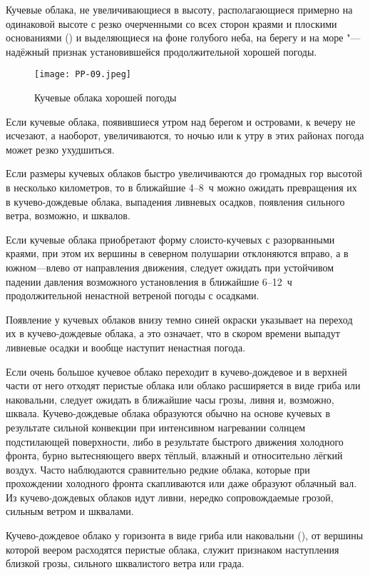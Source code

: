  Кучевые облака, не увеличивающиеся в высоту, располагающиеся
примерно на одинаковой высоте с резко очерченными со всех сторон
краями и плоскими основаниями () и выделяющиеся на фоне
голубого неба, на берегу и на море "--- надёжный признак установившейся
продолжительной хорошей погоды.

\begin{figure}[htb]
  \centering{}
  \texttt{[image: PP-09.jpeg]}
  \caption{Кучевые облака хорошей погоды}
  \label{fig:pp09}
  \small
  \centering{}
\end{figure}

 Если кучевые облака, появившиеся утром над берегом и островами,
к вечеру не исчезают, а наоборот, увеличиваются, то ночью или к утру в
этих районах погода может резко ухудшиться.

 Если размеры кучевых облаков быстро увеличиваются до громадных
гор высотой в несколько километров, то в ближайшие 4--8~ч можно ожидать
превращения их в кучево-дождевые облака, выпадения ливневых осадков,
появления сильного ветра, возможно, и шквалов.

 Если кучевые облака приобретают форму слоисто-кучевых с
разорванными краями, при этом их вершины в северном полушарии
отклоняются вправо, а в южном—влево от направления движения, следует
ожидать при устойчивом падении давления возможного установления в
ближайшие 6--12~ч продолжительной ненастной ветреной погоды с
осадками.

 Появление у кучевых облаков внизу темно синей окраски указывает
на переход их в кучево-дождевые облака, а это означает, что в скором
времени выпадут ливневые осадки и вообще наступит ненастная погода.

 Если очень большое кучевое облако переходит в кучево-дождевое и
в верхней части от него отходят перистые облака или облако расширяется
в виде гриба или наковальни, следует ожидать в ближайшие часы грозы,
ливня и, возможно, шквала. Кучево-дождевые облака образуются обычно на
основе кучевых в результате сильной конвекции при интенсивном
нагревании солнцем подстилающей поверхности, либо в результате
быстрого движения холодного фронта, бурно вытесняющего вверх тёплый,
влажный и относительно лёгкий воздух. Часто наблюдаются сравнительно
редкие облака, которые при прохождении холодного фронта скапливаются
или даже образуют облачный вал. Из кучево-дождевых облаков идут ливни,
нередко сопровождаемые грозой, сильным ветром и шквалами.

 Кучево-дождевое облако у горизонта в виде гриба или наковальни
(), от вершины которой веером расходятся перистые облака,
служит признаком наступления близкой грозы, сильного шквалистого ветра
или града.

